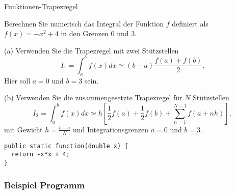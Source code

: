 \begin{frame}[fragile]%
\begin{exercise}{Funktionen-Trapezregel}
\begin{body}
\medskip

Berechnen Sie numerisch das Integral der Funktion $f$ definiert als $f(x) = -x^2+4$ in den Grenzen $0$ und $3$.
\begin{parts}
\item[(a)] Verwenden Sie die Trapezregel mit zwei St\"utzstellen
\[
I_1
= \int_a^b f(x)dx
\simeq (b-a)\frac{f(a)+f(b)}{2}
.\]
Hier soll $a=0$ und $b=3$ sein.
\item[(b)] Verwenden Sie die zusammengesetzte Trapezregel für $N$ St\"utzstellen
\[
I_2
= \int_a^b f(x)dx
\simeq h \left[\frac{1}{2}f(a)+\frac{1}{2}f(b)+\sum_{n=1}^{N-1}f\left(a+nh \right)\right]
,\]
mit Gewicht $h = \frac{b-a}{N}$ und Integrationsgrenzen $a=0$ und $b=3$.

\begin{lstlisting}[style=Java]
public static function(double x) {
  return -x*x + 4;
}
\end{lstlisting}
\end{parts}

\end{body}
\end{exercise}

\end{frame}

\begin{frame}[t]%
  \frametitle{Beispiel Programm}%
\medskip

\end{frame}
